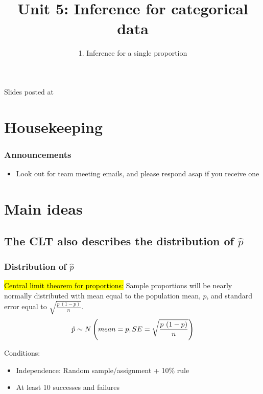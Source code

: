 \documentclass[11pt,containsverbatim,handout,xcolor=xelatex,dvipsnames,table]{beamer}
\title{Unit 5: Inference for categorical data}
\subtitle{1. Inference for a single proportion}
\author{\CourseName}
\date{}
\institute{\InstituteName}
\begin{document}



\begin{frame}[plain]

\titlepage

\vfill

{\scriptsize {} \hfill Slides posted at  \webURL{\CourseSite}}

\addtocounter{framenumber}{-1} 

\end{frame}


\section{Housekeeping}


\begin{frame}
\frametitle{Announcements}

\begin{itemize}

\item Look out for team meeting emails, and please respond asap if you receive one

\end{itemize}

\end{frame}


\section{Main ideas}


\subsection{The CLT also describes the distribution of $\hat{p}$}
\label{mi2}


\begin{frame}
\frametitle{Distribution of $\hat{p}$}

\hl{Central limit theorem for proportions:} Sample proportions will be nearly normally distributed with 
mean equal to the population mean, $p$, and standard error equal to $\sqrt{\frac{p~(1-p)}{n}}$.
\[ \hat{p} \sim N \left(  mean = p, SE = \sqrt{\frac{p~(1-p)}{n}}  \right) \]

Conditions:
\begin{itemize}
\item Independence: Random sample/assignment + 10\% rule
\item At least 10 successes and failures
\end{itemize}

\end{frame}
\end{document}
